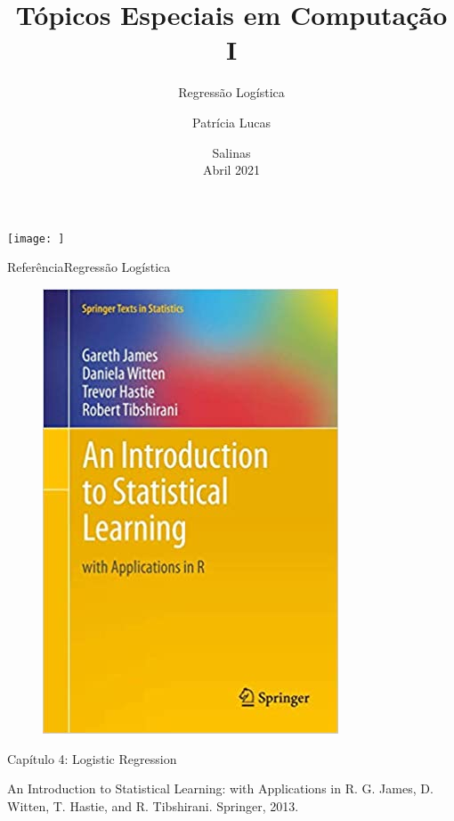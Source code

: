 \documentclass[t]{beamer}
\title[]{Tópicos Especiais em Computação I}
\subtitle[]{Regressão Logística}
\author[]{Patrícia Lucas\\{\footnotesize }}
\institute{Bacharelado em Sistemas de Informação \\ IFNMG  - Campus Salinas}
\date{\scriptsize Salinas\\Abril 2021}
\begin{document}
\begin{frame}

\begin{center}
\texttt{[image: ]}
\end{center}
  \titlepage
\end{frame}


\begin{ftst}{Referência}{Regressão Logística}
\begin{figure}
    \includegraphics[scale=0.3]{Figuras/slide03_01.jpg}
\end{figure}
Capítulo 4: Logistic Regression
\vone
\scriptsize

An Introduction to Statistical Learning: with Applications in R. G. James, D. Witten, T. Hastie, and R. Tibshirani. Springer, 2013.

\end{ftst}
\end{document}
